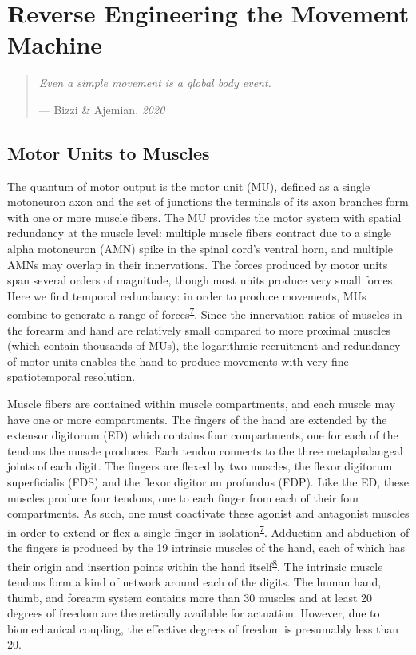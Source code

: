 \documentclass[
  a4paper,
]{article}
\begin{document}
\clearpage

\hypertarget{sec:physiology}{%
\section{Reverse Engineering the Movement
Machine}\label{sec:physiology}}

\begin{quote}
\emph{Even a simple movement is a global body event.}

--- Bizzi \& Ajemian, \emph{2020}
\end{quote}

\hypertarget{motor-units-to-muscles}{%
\subsection{Motor Units to Muscles}\label{motor-units-to-muscles}}

The quantum of motor output is the motor unit (MU), defined as a single
motoneuron axon and the set of junctions the terminals of its axon
branches form with one or more muscle fibers. The MU provides the motor
system with spatial redundancy at the muscle level: multiple muscle
fibers contract due to a single alpha motoneuron (AMN) spike in the
spinal cord's ventral horn, and multiple AMNs may overlap in their
innervations. The forces produced by motor units span several orders of
magnitude, though most units produce very small forces. Here we find
temporal redundancy: in order to produce movements, MUs combine to
generate a range of
forces\textsuperscript{\protect\hyperlink{ref-fuglevandMechanicalPropertiesNeural2011}{7}}.
Since the innervation ratios of muscles in the forearm and hand are
relatively small compared to more proximal muscles (which contain
thousands of MUs), the logarithmic recruitment and redundancy of motor
units enables the hand to produce movements with very fine
spatiotemporal resolution.

Muscle fibers are contained within muscle compartments, and each muscle
may have one or more compartments. The fingers of the hand are extended
by the extensor digitorum (ED) which contains four compartments, one for
each of the tendons the muscle produces. Each tendon connects to the
three metaphalangeal joints of each digit. The fingers are flexed by two
muscles, the flexor digitorum superficialis (FDS) and the flexor
digitorum profundus (FDP). Like the ED, these muscles produce four
tendons, one to each finger from each of their four compartments. As
such, one must coactivate these agonist and antagonist muscles in order
to extend or flex a single finger in
isolation\textsuperscript{\protect\hyperlink{ref-fuglevandMechanicalPropertiesNeural2011}{7}}.
Adduction and abduction of the fingers is produced by the 19 intrinsic
muscles of the hand, each of which has their origin and insertion points
within the hand
itself\textsuperscript{\protect\hyperlink{ref-vanduinenConstraintsControlHuman2011}{8}}.
The intrinsic muscle tendons form a kind of network around each of the
digits. The human hand, thumb, and forearm system contains more than 30
muscles and at least 20 degrees of freedom are theoretically available
for actuation. However, due to biomechanical coupling, the effective
degrees of freedom is presumably less than 20.
\end{document}
